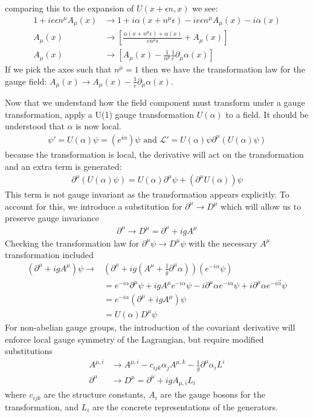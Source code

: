 comparing this to the expansion of $U(x+\epsilon n, x)$ we see:
\begin{align*}
1 + ie\epsilon n^\mu A_\mu (x) &\rightarrow 1 + i \alpha (x+n^\mu\epsilon ) - ie \epsilon n^\mu A_\mu(x) - i\alpha(x)\\
A_\mu(x) &\rightarrow  \left [ \frac{\alpha(x+n^\mu\epsilon) + \alpha(x)}{en^\mu \epsilon} + A_\mu(x) \right] \\
A_\mu(x) &\rightarrow  \left [  A_\mu(x)  -\frac{1}{n^\mu}\frac{1}{e}\partial_\mu \alpha(x) \right]
\end{align*}
If we pick the axes such that $n^\mu = 1$ then we have the transformation law for the gauge field: $A_\mu(x) \rightarrow A_\mu(x) - \frac{1}{e} \partial_\mu \alpha(x)$. 

Now that we understand how the field component must transform under a gauge transformation, apply a U(1) gauge transformation $U(\alpha)$ 
 to a field. It should be understood that $\alpha$ is now local.
\begin{align*}
\psi' = U(\alpha) \psi = ( e^{i\alpha})\psi \text{ and } \mathcal{L}' = U(\alpha)\psi \partial^\mu ( U(\alpha) \psi)
\end{align*}
because the transformation is local, the derivative will act on the transformation and an extra term is generated:
\begin{align*}
\partial^\mu ( U(\alpha) \psi) = U(\alpha) \partial^\mu \psi + ( \partial^\mu U(\alpha)) \psi 
\end{align*}
This term is not gauge invariant as the transformation appears explicitly. To account for this, we introduce a substitution for $\partial^\mu \rightarrow D^\mu $
which will allow us to preserve gauge invariance 
\begin{align*}
\partial^\mu \rightarrow D^\mu = \partial^\mu + igA^\mu
\end{align*}
Checking the transformation law for $\partial^\mu \psi\rightarrow D^\mu\psi$ with the necessary $A^\mu$ transformation included
\begin{align*}
(\partial^\mu + ig A^\mu ) \psi \rightarrow &\left (\partial^\mu + ig  (A^\mu +  \frac{1}{g} \partial^\mu \alpha)\right )( e^{-i \alpha } \psi ) \\
&= e^{-i \alpha } \partial^\mu \psi + ig A^\mu e^{-i\alpha} \psi - i\partial^\mu \alpha e^{-i \alpha} \psi + i\partial^\mu \alpha e^{-i \vec \alpha} \psi \\
&= e^{-i \alpha} (\partial^\mu + ig  A^\mu )\psi \\
&= U(\alpha) D^\mu \psi
\end{align*}
For non-abelian gauge groups, the introduction of the covariant derivative will enforce local 
gauge symmetry of the Lagrangian, but require modified substitutions
\begin{align*}
A^{\mu,i} &\rightarrow A^{\mu,i} -  c_{ijk} \alpha_j A^{\mu,k} - \frac{1}{g} \partial^\mu \alpha_iL^i\\
\partial^\mu &\rightarrow D^\mu =  \partial^\mu + igA_{\mu,i}L_i
\end{align*}
where $c_{ijk}$ are the structure constants, $A_i$ are the gauge bosons for the transformation, and $L_i$ are the 
concrete representations of the generators. 

